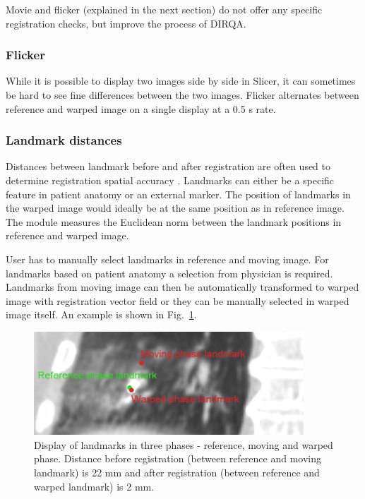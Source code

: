 \documentclass[type=dr, dr=rernat, accentcolor=tud7b,colorbacktitle, bigchapter, openright, twoside, 12pt ]{tudthesis}
\begin{document}
Movie and flicker (explained in the next section) do not offer any specific registration checks, but improve the process of DIRQA.

\subsubsection{Flicker}

While it is possible to display two images side by side in Slicer, it can sometimes be hard to see fine differences between the two images. Flicker alternates between reference and warped image on a single display at a 0.5 s rate.

\subsubsection{Landmark distances}

Distances between landmark before and after registration are often used to determine registration spatial accuracy \cite{Castillo2009}. 
Landmarks can either be a specific feature in patient anatomy or an external marker. The position of landmarks in the warped image would ideally 
be at the same position as in reference image. The module measures the Euclidean norm between the landmark positions in reference and warped image.

User has to manually select landmarks in reference and moving image. For landmarks based on patient anatomy a selection from physician is required. 
Landmarks from moving image can then be automatically transformed to warped image with registration vector field or they can be manually selected in warped image itself. An example is shown in Fig.~\ref{landmark}.

\begin{figure}[H]
\begin{center}
\includegraphics[width=0.9\textwidth]{./Images/landmark.png}
\caption{Display of landmarks in three phases - reference, moving and warped phase. Distance before registration (between reference and moving landmark) is 22 mm and after registration
(between reference and warped landmark) is 2 mm.}
\label{landmark}
\end{center}
\end{figure}
\end{document}
